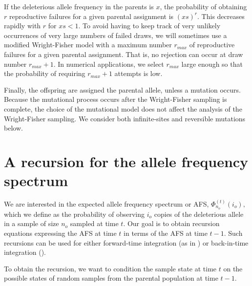 \documentclass[9pt,twocolumn,twoside,lineno]{gsajnl}
\newcommand{\afs}[2]{\Phi_{#1}^{(#2)}}
\newcommand{\sgcomment}[1]{\textcolor{blue}{SG: #1}}
\begin{document}
If the deleterious allele frequency in the parents is $x$, the probability of obtaining $r$ reproductive failures for a given parental assignment is $(xs)^r.$ This decreases rapidly with $r$ for $xs<1.$ To avoid having to keep track of very unlikely occurrences of very large numbers of failed draws, we will sometimes use a modified Wright-Fisher model with a maximum number $r_{max}$ of reproductive failures for a given parental assignment. That is, no rejection can occur at draw number $r_{max}+1.$  In numerical applications, we select $r_{max}$ large enough so that the probability of requiring $r_{max}+1$ attempts is low.    
 
Finally, the offspring are assigned the parental allele, unless a mutation occurs. Because the mutational process occurs after the Wright-Fisher sampling is complete, the choice of the mutational model does not affect the analysis of the Wright-Fisher sampling. We consider both infinite-sites and reversible mutations below.


\section{A recursion for the allele frequency spectrum}
We are interested in the expected allele frequency spectrum or AFS, $\afs{n_o}{t}(i_o),$ which we
define as the probability of observing $i_o$ copies of the deleterious allele in a sample of size $n_o$ sampled at time $t$. Our goal is to obtain recursion equations expressing the AFS at time $t$ in terms of the AFS at time $t-1$. Such recursions can be used for either forward-time integration (as in \cite{JouganousEtAl2017}) or back-in-time integration (\cite{KammEtAl2017}). 

To obtain the recursion, we want to condition the sample state at time $t$ on the possible states of random samples from the parental population at time $t-1$.  
\end{document}
